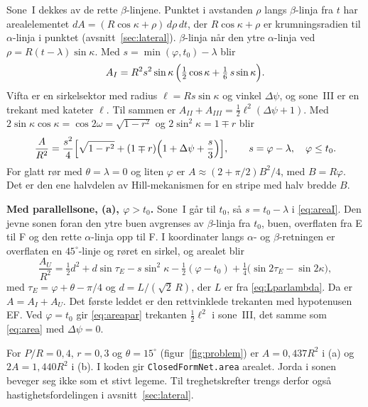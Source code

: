 \documentclass[11pt,a4paper]{article}
\begin{document}
Sone~I dekkes av de rette $\beta$-linjene.  Punktet i avstanden $\rho$ langs
$\beta$-linja fra $t$ har arealelementet $dA = (R\cos\kappa + \rho)\,d\rho\,dt$,
der $R\cos\kappa + \rho$ er krumningsradien til $\alpha$-linja i punktet
(avsnitt~\ref{sec:lateral}).  $\beta$-linja når den ytre $\alpha$-linja ved
$\rho = R(t - \lambda)\sin\kappa$.  Med $s = \min(\varphi, t_0) - \lambda$ blir
\begin{equation}
  A_I = R^2 s^2 \sin\kappa\,\Bigl(\tfrac12\cos\kappa + \tfrac16\,s\sin\kappa\Bigr) .
  \label{eq:areaI}
\end{equation}
Vifta er en sirkelsektor med radius $\ell = Rs\sin\kappa$ og vinkel
$\Delta\psi$, og sone~III er en trekant med kateter $\ell$.  Til sammen er
$A_{II} + A_{III} = \tfrac12\ell^2(\Delta\psi + 1)$.  Med
$2\sin\kappa\cos\kappa = \cos 2\omega = \sqrt{1 - r^2}$ og
$2\sin^2\kappa = 1 \mp r$ blir
\begin{equation}
  \frac{A}{R^2} = \frac{s^2}{4}\Bigl[\sqrt{1 - r^2}
                  + (1 \mp r)\Bigl(1 + \Delta\psi + \frac{s}{3}\Bigr)\Bigr] ,
  \qquad s = \varphi - \lambda ,\quad \varphi \le t_0 .
  \label{eq:area}
\end{equation}
For glatt rør med $\theta = \lambda = 0$ og liten $\varphi$ er
$A \approx (2 + \pi/2)B^2/4$, med $B = R\varphi$.  Det er den ene halvdelen
av Hill-mekanismen for en stripe med halv bredde $B$.

\textbf{Med parallellsone, (a), $\varphi > t_0$.}  Sone~I går til $t_0$, så
$s = t_0 - \lambda$ i \eqref{eq:areaI}.  Den jevne sonen foran den ytre buen
avgrenses av $\beta$-linja fra $t_0$, buen, overflaten fra E til F og den
rette $\alpha$-linja opp til F.  I koordinater langs $\alpha$- og
$\beta$-retningen er overflaten en $45^\circ$-linje og røret en sirkel, og
arealet blir
\begin{equation}
  \frac{A_U}{R^2} = \tfrac12 d^2 + d\sin\tau_E - s\sin^2\kappa
                    - \tfrac12(\varphi - t_0) + \tfrac14\bigl(\sin 2\tau_E - \sin 2\kappa\bigr) ,
  \label{eq:areapar}
\end{equation}
med $\tau_E = \varphi + \theta - \pi/4$ og $d = L/(\sqrt2\,R)$, der $L$ er
fra \eqref{eq:Lparlambda}.  Da er $A = A_I + A_U$.  Det første leddet er den
rettvinklede trekanten med hypotenusen EF.  Ved $\varphi = t_0$ gir
\eqref{eq:areapar} trekanten $\tfrac12\ell^2$ i sone~III, det samme som
\eqref{eq:area} med $\Delta\psi = 0$.

For $P/R = 0{,}4$, $r = 0{,}3$ og $\theta = 15^\circ$
(figur~\ref{fig:problem}) er $A = 0{,}437R^2$ i (a) og $2A = 1{,}440R^2$ i
(b).  I koden gir \texttt{ClosedFormNet.area} arealet.  Jorda i sonen beveger
seg ikke som et stivt legeme.  Til treghetskrefter trengs derfor også
hastighetsfordelingen i avsnitt~\ref{sec:lateral}.
\end{document}
